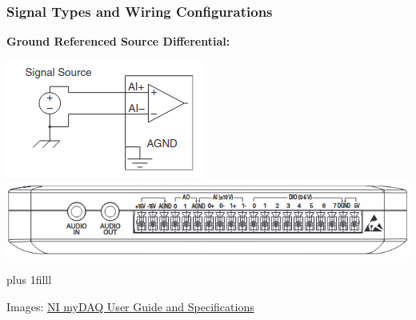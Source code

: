 \documentclass[fleqn]{beamer} %
\newcommand{\sectionIIsubsectionItitle}{Signal Types and Wiring Configurations}
\newcommand{\btVFill}{\vskip0pt plus 1filll}
\begin{document}
			\begin{frame}[label=sectionIIsubsectionI]
				\frametitle{\sectionIIsubsectionItitle} \scriptsize
        
        \textbf{Ground Referenced Source Differential:}\vspcc

        \includegraphics[scale=.4]{images/ground_referenced_differential_cropped.png}        
        \includegraphics[scale=.3]{images/myDAQ_IOconnector.png}        
        
        \btVFill

        \tiny{Images: \href{https://www.ni.com/docs/en-US/bundle/mydaq-features/resource/373060g.pdf?srsltid=AfmBOopyngxK8Pza757m5IPrgx3KmoUmOST4Bx7spVeotMbMLTHwKHL1}{NI myDAQ User Guide and Specifications}}
  			\end{frame}	
\end{document}

